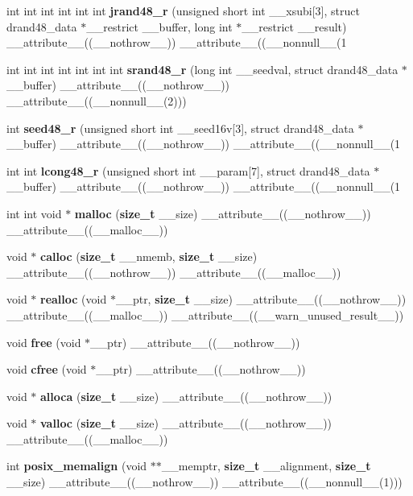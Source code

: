 \begin{DoxyCompactItemize}
\item 
int int int int int int {\bf jrand48\_\-r} (unsigned short int \_\-\_\-xsubi[3], struct drand48\_\-data $\ast$\_\-\_\-restrict \_\-\_\-buffer, long int $\ast$\_\-\_\-restrict \_\-\_\-result) \_\-\_\-attribute\_\-\_\-((\_\-\_\-nothrow\_\-\_\-)) \_\-\_\-attribute\_\-\_\-((\_\-\_\-nonnull\_\-\_\-(1
\item 
int int int int int int int {\bf srand48\_\-r} (long int \_\-\_\-seedval, struct drand48\_\-data $\ast$\_\-\_\-buffer) \_\-\_\-attribute\_\-\_\-((\_\-\_\-nothrow\_\-\_\-)) \_\-\_\-attribute\_\-\_\-((\_\-\_\-nonnull\_\-\_\-(2)))
\item 
int {\bf seed48\_\-r} (unsigned short int \_\-\_\-seed16v[3], struct drand48\_\-data $\ast$\_\-\_\-buffer) \_\-\_\-attribute\_\-\_\-((\_\-\_\-nothrow\_\-\_\-)) \_\-\_\-attribute\_\-\_\-((\_\-\_\-nonnull\_\-\_\-(1
\item 
int int {\bf lcong48\_\-r} (unsigned short int \_\-\_\-param[7], struct drand48\_\-data $\ast$\_\-\_\-buffer) \_\-\_\-attribute\_\-\_\-((\_\-\_\-nothrow\_\-\_\-)) \_\-\_\-attribute\_\-\_\-((\_\-\_\-nonnull\_\-\_\-(1
\item 
int int void $\ast$ {\bf malloc} ({\bf size\_\-t} \_\-\_\-size) \_\-\_\-attribute\_\-\_\-((\_\-\_\-nothrow\_\-\_\-)) \_\-\_\-attribute\_\-\_\-((\_\-\_\-malloc\_\-\_\-))
\item 
void $\ast$ {\bf calloc} ({\bf size\_\-t} \_\-\_\-nmemb, {\bf size\_\-t} \_\-\_\-size) \_\-\_\-attribute\_\-\_\-((\_\-\_\-nothrow\_\-\_\-)) \_\-\_\-attribute\_\-\_\-((\_\-\_\-malloc\_\-\_\-))
\item 
void $\ast$ {\bf realloc} (void $\ast$\_\-\_\-ptr, {\bf size\_\-t} \_\-\_\-size) \_\-\_\-attribute\_\-\_\-((\_\-\_\-nothrow\_\-\_\-)) \_\-\_\-attribute\_\-\_\-((\_\-\_\-malloc\_\-\_\-)) \_\-\_\-attribute\_\-\_\-((\_\-\_\-warn\_\-unused\_\-result\_\-\_\-))
\item 
void {\bf free} (void $\ast$\_\-\_\-ptr) \_\-\_\-attribute\_\-\_\-((\_\-\_\-nothrow\_\-\_\-))
\item 
void {\bf cfree} (void $\ast$\_\-\_\-ptr) \_\-\_\-attribute\_\-\_\-((\_\-\_\-nothrow\_\-\_\-))
\item 
void $\ast$ {\bf alloca} ({\bf size\_\-t} \_\-\_\-size) \_\-\_\-attribute\_\-\_\-((\_\-\_\-nothrow\_\-\_\-))
\item 
void $\ast$ {\bf valloc} ({\bf size\_\-t} \_\-\_\-size) \_\-\_\-attribute\_\-\_\-((\_\-\_\-nothrow\_\-\_\-)) \_\-\_\-attribute\_\-\_\-((\_\-\_\-malloc\_\-\_\-))
\item 
int {\bf posix\_\-memalign} (void $\ast$$\ast$\_\-\_\-memptr, {\bf size\_\-t} \_\-\_\-alignment, {\bf size\_\-t} \_\-\_\-size) \_\-\_\-attribute\_\-\_\-((\_\-\_\-nothrow\_\-\_\-)) \_\-\_\-attribute\_\-\_\-((\_\-\_\-nonnull\_\-\_\-(1)))
$$
\end{DoxyCompactItemize}
